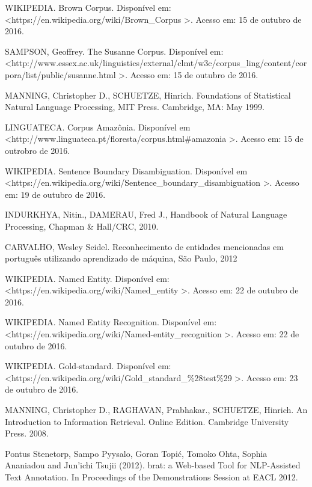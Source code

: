 \documentclass[11pt]{report}
\begin{document}
\begin{enumerate}[label={[\arabic*]}]
\item WIKIPEDIA. Brown Corpus. Disponível em: \textless\enspace https://en.wikipedia.org/wiki/Brown\_Corpus \enspace\textgreater. Acesso em: 15 de outubro de 2016.
\item SAMPSON, Geoffrey. The Susanne Corpus. Disponível em: \newline\textless\enspace http://www.essex.ac.uk/linguistics/external/clmt/w3c/corpus\_ling/content/\newline corpora/list/public/susanne.html \enspace\textgreater. Acesso em: 15 de outubro de 2016.
\item MANNING, Christopher D., SCHUETZE, Hinrich. Foundations of Statistical Natural Language Processing, MIT Press. Cambridge, MA: May 1999.
\item LINGUATECA. Corpus Amazônia. Disponível em \textless\enspace http://www.linguateca.pt/floresta/\newline corpus.html\#amazonia \enspace\textgreater. Acesso em: 15 de outrobro de 2016.
\item WIKIPEDIA. Sentence Boundary Disambiguation. Disponível em \newline\textless\enspace https://en.wikipedia.org/wiki/Sentence\_boundary\_disambiguation \enspace\textgreater. Acesso em: 19 de outubro de 2016.
\item INDURKHYA, Nitin., DAMERAU, Fred J., Handbook of Natural Language Processing, Chapman \& Hall/CRC, 2010.
\item CARVALHO, Wesley Seidel. Reconhecimento de entidades mencionadas em português utilizando aprendizado de máquina, São Paulo, 2012
\item WIKIPEDIA. Named Entity. Disponível em: \newline\textless\enspace https://en.wikipedia.org/wiki/Named\_entity \enspace\textgreater. Acesso em: 22 de outubro de 2016.
\item WIKIPEDIA. Named Entity Recognition. Disponível em: \newline\textless\enspace https://en.wikipedia.org/wiki/Named-entity\_recognition \enspace\textgreater. Acesso em: 22 de outubro de 2016.
\item WIKIPEDIA. Gold-standard. Disponível em: \newline\textless\enspace https://en.wikipedia.org/wiki/Gold\_standard\_\%28test\%29 \enspace\textgreater. Acesso em: 23 de outubro de 2016.
\item MANNING, Christopher D., RAGHAVAN, Prabhakar., SCHUETZE, Hinrich. An Introduction to Information Retrieval. Online Edition. Cambridge University Press. 2008.
\item Pontus Stenetorp, Sampo Pyysalo, Goran Topić, Tomoko Ohta, Sophia Ananiadou and Jun'ichi Tsujii (2012). brat: a Web-based Tool for NLP-Assisted Text Annotation. In Proceedings of the Demonstrations Session at EACL 2012.
\end{enumerate}
\end{document}

